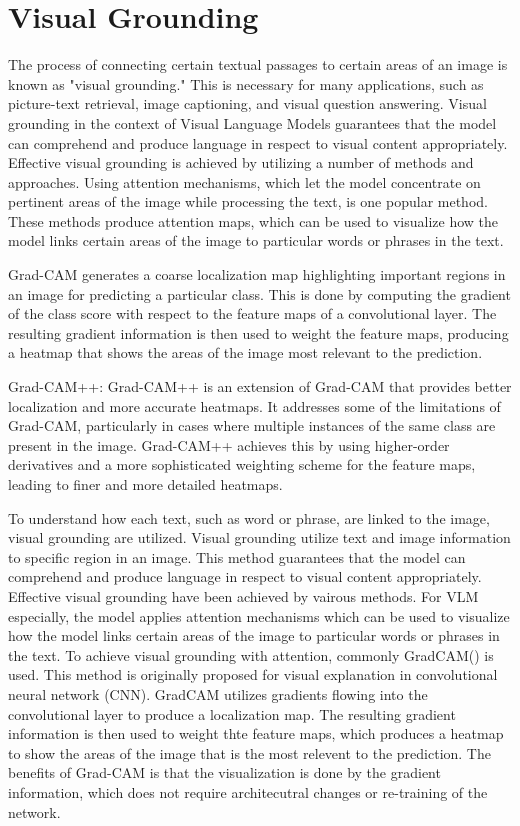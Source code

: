 \section{Visual Grounding}
The process of connecting certain textual passages to certain areas of an image is known as "visual grounding." This is necessary for many applications, such as picture-text retrieval, image captioning, and visual question answering. Visual grounding in the context of Visual Language Models guarantees that the model can comprehend and produce language in respect to visual content appropriately. Effective visual grounding is achieved by utilizing a number of methods and approaches. Using attention mechanisms, which let the model concentrate on pertinent areas of the image while processing the text, is one popular method. These methods produce attention maps, which can be used to visualize how the model links certain areas of the image to particular words or phrases in the text.

Grad-CAM generates a coarse localization map highlighting important regions in an image for predicting a particular class. This is done by computing the gradient of the class score with respect to the feature maps of a convolutional layer. The resulting gradient information is then used to weight the feature maps, producing a heatmap that shows the areas of the image most relevant to the prediction.

Grad-CAM++:
Grad-CAM++ is an extension of Grad-CAM that provides better localization and more accurate heatmaps. It addresses some of the limitations of Grad-CAM, particularly in cases where multiple instances of the same class are present in the image. Grad-CAM++ achieves this by using higher-order derivatives and a more sophisticated weighting scheme for the feature maps, leading to finer and more detailed heatmaps.

To understand how each text, such as word or phrase, are linked to the image, visual grounding are utilized. Visual grounding utilize text and image information to specific region in an image. This method guarantees that the model can comprehend and produce language in respect to visual content appropriately. Effective visual grounding have been achieved by vairous methods. For VLM especially, the model applies attention mechanisms which can be used to visualize how the model links certain areas of the image to particular words or phrases in the text.
To achieve visual grounding with attention, commonly GradCAM(\cite{gradcam}) is used. This method is originally proposed for visual explanation in convolutional neural network (CNN). GradCAM utilizes gradients flowing into the convolutional layer to produce a localization map. The resulting gradient information is then used to weight thte feature maps, which produces a heatmap to show the areas of the image that is the most relevent to the prediction. The benefits of Grad-CAM is that the visualization is done by the gradient information, which does not require architecutral changes or re-training of the network.

